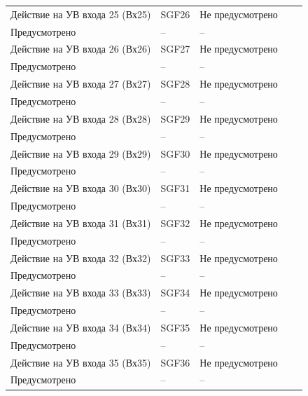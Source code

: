 \begin{longtable}{|>{\centering\arraybackslash}m{5.3cm}|>{\centering\arraybackslash}m{3.3cm}|>{\centering\arraybackslash}m{4.2cm}|>{\centering\arraybackslash}m{1.8cm}|>{\centering\arraybackslash}m{1cm}|}
\hline
\centering Действие на УВ входа 25 (Вх25)  & \centering SGF26 & \centering Не предусмотрено \\ Предусмотрено & \centering -- & \centering \arraybackslash -- \\
\hline
\centering Действие на УВ входа 26 (Вх26)  & \centering SGF27 & \centering Не предусмотрено \\ Предусмотрено & \centering -- & \centering \arraybackslash -- \\
\hline
\centering Действие на УВ входа 27 (Вх27)  & \centering SGF28 & \centering Не предусмотрено \\ Предусмотрено & \centering -- & \centering \arraybackslash -- \\
\hline
\centering Действие на УВ входа 28 (Вх28)  & \centering SGF29 & \centering Не предусмотрено \\ Предусмотрено & \centering -- & \centering \arraybackslash -- \\
\hline
\centering Действие на УВ входа 29 (Вх29)  & \centering SGF30 & \centering Не предусмотрено \\ Предусмотрено & \centering -- & \centering \arraybackslash -- \\
\hline
\centering Действие на УВ входа 30 (Вх30)  & \centering SGF31 & \centering Не предусмотрено \\ Предусмотрено & \centering -- & \centering \arraybackslash -- \\
\hline
\centering Действие на УВ входа 31 (Вх31)  & \centering SGF32 & \centering Не предусмотрено \\ Предусмотрено & \centering -- & \centering \arraybackslash -- \\
\hline
\centering Действие на УВ входа 32 (Вх32)  & \centering SGF33 & \centering Не предусмотрено \\ Предусмотрено & \centering -- & \centering \arraybackslash -- \\
\hline
\centering Действие на УВ входа 33 (Вх33)  & \centering SGF34 & \centering Не предусмотрено \\ Предусмотрено & \centering -- & \centering \arraybackslash -- \\
\hline
\centering Действие на УВ входа 34 (Вх34)  & \centering SGF35 & \centering Не предусмотрено \\ Предусмотрено & \centering -- & \centering \arraybackslash -- \\
\hline
\centering Действие на УВ входа 35 (Вх35)  & \centering SGF36 & \centering Не предусмотрено \\ Предусмотрено & \centering -- & \centering \arraybackslash -- \\

\end{longtable}
